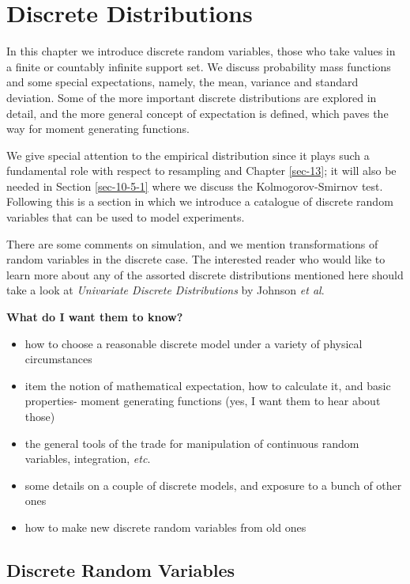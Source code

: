 \chapter{Discrete Distributions}
\label{sec-5}

\noindent
In this chapter we introduce discrete random variables, those who take
values in a finite or countably infinite support set. We discuss
probability mass functions and some special expectations, namely, the
mean, variance and standard deviation. Some of the more important
discrete distributions are explored in detail, and the more general
concept of expectation is defined, which paves the way for moment
generating functions.

We give special attention to the empirical distribution since it plays
such a fundamental role with respect to resampling and Chapter
\ref{sec-13}; it will also be needed in Section
\ref{sec-10-5-1} where we discuss the Kolmogorov-Smirnov
test. Following this is a section in which we introduce a catalogue of
discrete random variables that can be used to model experiments.

There are some comments on simulation, and we mention transformations
of random variables in the discrete case. The interested reader who
would like to learn more about any of the assorted discrete
distributions mentioned here should take a look at \emph{Univariate
Discrete Distributions} by Johnson \emph{et al}\cite{Johnson1993}.

\textbf{What do I want them to know?}
\begin{itemize}
\item how to choose a reasonable discrete model under a variety of
physical circumstances
\item item the notion of mathematical expectation, how to calculate it,
and basic properties- moment generating functions (yes, I want them
to hear about those)
\item the general tools of the trade for manipulation of continuous random
variables, integration, \emph{etc}.
\item some details on a couple of discrete models, and exposure to a bunch
of other ones
\item how to make new discrete random variables from old ones
\end{itemize}

\section{Discrete Random Variables}
\label{sec-5-1}

